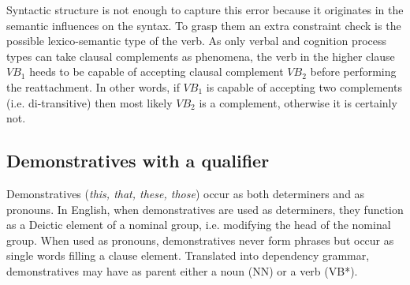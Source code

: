     Syntactic structure is not enough to capture this error because it originates in the semantic influences on the syntax. To grasp them an extra constraint check is the possible lexico-semantic type of the verb. As only verbal and cognition process types can take clausal complements as phenomena, the verb in the higher clause $VB_1$ heeds to be capable of accepting clausal complement $VB_2$ before performing the reattachment. In other words, if $VB_1$ is capable of accepting two complements (i.e. di-transitive) then most likely $VB_2$ is a complement, otherwise it is certainly not.



\subsection{Demonstratives with a qualifier}
    Demonstratives (\textit{this, that, these, those}) occur as both determiners and as pronouns. In English, when demonstratives are used as determiners, they function as a Deictic element of a nominal group, i.e. modifying the head of the nominal group. When used as pronouns, demonstratives never form phrases but occur as single words filling a clause element. Translated into dependency grammar, demonstratives may have as parent either a noun (NN) or a verb (VB*). 
    

